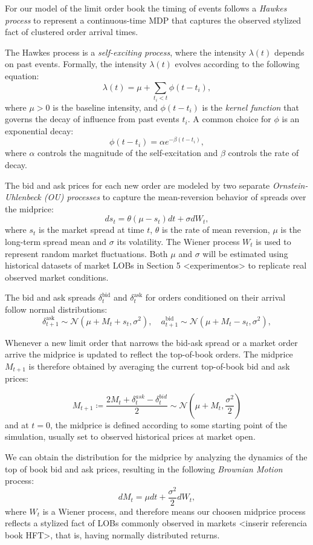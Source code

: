 For our model of the limit order book the timing of events follows a \textit{Hawkes process}
to represent a continuous-time MDP that captures the observed stylized fact of clustered order arrival times.

The Hawkes process is a \textit{self-exciting process}, where the intensity \( \lambda(t) \) depends on past events.
Formally, the intensity \( \lambda(t) \) evolves according to the following equation:
\[
    \lambda(t) = \mu + \sum_{t_i < t} \phi(t - t_i),
\]
where \( \mu > 0 \) is the baseline intensity, and \( \phi(t - t_i) \) is the \textit{kernel function} that governs the decay of influence from past events \( t_i \).
A common choice for \( \phi \) is an exponential decay:
\[
    \phi(t - t_i) = \alpha e^{-\beta (t - t_i)},
\]
where \(\alpha\) controls the magnitude of the self-excitation and \(\beta\) controls the rate of decay.

The bid and ask prices for each new order are modeled by two separate \textit{Ornstein-Uhlenbeck (OU) processes} to capture the mean-reversion behavior of spreads over the midprice:
\[
    ds_t = \theta(\mu - s_t) dt + \sigma dW_t,
\]
where $s_t$ is the market spread at time $t$, $\theta$ is the rate of mean reversion, $\mu$ is the long-term spread mean and $\sigma$ its volatility.
The Wiener process $W_t$ is used to represent random market fluctuations.
Both $\mu$ and $\sigma$ will be estimated using historical datasets of market LOBs in Section 5 <experimentos> to replicate real observed market conditions.

The bid and ask spreads $\delta_t^{\text{bid}}$ and $ \delta_t^{\text{ask}}$ for orders conditioned on their arrival follow normal distributions:
\[
    \delta_{t+1}^{\text{ask}} \sim \mathcal{N}(\mu + M_{t} + s_t, \sigma^2), \quad a_{t+1}^{\text{bid}} \sim \mathcal{N}(\mu + M_{t} - s_t, \sigma^2),
\]

Whenever a new limit order that narrows the bid-ask spread or a market order arrive the midprice is updated to reflect the top-of-book orders.
The midprice $M_{t+1}$ is therefore obtained by averaging the current top-of-book bid and ask prices:

\[
    M_{t+1} \coloneqq \frac{2M_t + \delta^{ask}_{t} - \delta^{bid}_{t}}{2}
    \sim \mathcal{N}\left(\mu + M_{t}, \frac{\sigma^2}{2}\right)
\]
and at $t = 0$, the midprice is defined according to some starting point of the simulation, usually set to observed historical prices at market open.

We can obtain the distribution for the midprice by analyzing the dynamics of the top of book bid and ask prices, resulting in the following \textit{Brownian Motion} process:
\[
    dM_t = \mu dt + \frac{\sigma^2}{2} dW_t,
\]
where \( W_t \) is a Wiener process, and therefore means our choosen midprice process reflects a stylized fact of LOBs commonly observed in markets <inserir referencia book HFT>, that is, having normally distributed returns.

